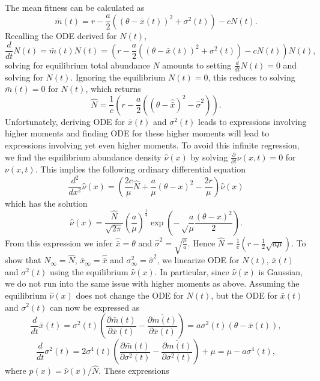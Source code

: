 \documentclass[]{article}
\begin{document}
The mean fitness can be calculated as \begin{equation}
\bar m(t)=r-\frac{a}{2}((\theta-\bar x(t))^2+\sigma^2(t))-cN(t).
\end{equation} Recalling the ODE derived for \(N(t)\), \begin{equation}
\frac{d}{dt}N(t)=\bar m(t)N(t)=(r-\frac{a}{2}((\theta-\bar x(t))^2+\sigma^2(t))-cN(t))N(t),
\end{equation} solving for equilibrium total abundance \(\hat N\)
amounts to setting \(\frac{d}{dt}N(t)=0\) and solving for \(N(t)\).
Ignoring the equilibrium \(N(t)=0\), this reduces to solving
\(\bar m(t)=0\) for \(N(t)\), which returns \begin{equation}
\hat N=\frac{1}{c}\left(r-\frac{a}{2}\left((\theta-\hat{\bar x})^2-\hat\sigma^2\right)\right).
\end{equation} Unfortunately, deriving ODE for \(\bar x(t)\) and
\(\sigma^2(t)\) leads to expressions involving higher moments and
finding ODE for these higher moments will lead to expressions involving
yet even higher moments. To avoid this infinite regression, we find the
equilibrium abundance density \(\hat\nu(x)\) by solving
\(\frac{\partial}{\partial t}\nu(x,t)=0\) for \(\nu(x,t)\). This implies
the following ordinary differential equation \begin{equation}
\frac{d^2}{dx^2}\hat\nu(x)=\left(\frac{2c}{\mu}\hat N+\frac{a}{\mu}(\theta-x)^2-\frac{2r}{\mu}\right)\hat\nu(x)
\end{equation} which has the solution \begin{equation}
\hat\nu(x)=\frac{\hat N}{\sqrt{2\pi}}\left(\frac{a}{\mu}\right)^{\frac{1}{4}}\exp\left(-\sqrt\frac{a}{\mu}\frac{(\theta-x)^2}{2}\right).
\end{equation} From this expression we infer \(\hat{\bar x}=\theta\) and
\(\hat\sigma^2=\sqrt{\frac{\mu}{a}}\). Hence
\(\hat N=\frac{1}{c}\left(r-\frac{1}{2}\sqrt{a\mu}\right)\). To show
that \(N_\infty=\hat N\), \(\bar x_\infty=\hat{\bar x}\) and
\(\sigma^2_\infty=\hat\sigma^2\), we linearize ODE for \(N(t)\),
\(\bar x(t)\) and \(\sigma^2(t)\) using the equilibrium \(\hat\nu(x)\).
In particular, since \(\hat\nu(x)\) is Gaussian, we do not run into the
same issue with higher moments as above. Assuming the equilibrium
\(\hat\nu(x)\) does not change the ODE for \(N(t)\), but the ODE for
\(\bar x(t)\) and \(\sigma^2(t)\) can now be expressed as
\begin{equation}
\frac{d}{dt}\bar x(t)=\sigma^2(t)\left(\frac{\partial\bar m(t)}{\partial\bar x(t)}-\overline{\frac{\partial m(t)}{\partial\bar x(t)}}\right)=a\sigma^2(t)(\theta-\bar x(t)),
\end{equation} \begin{equation}
\frac{d}{dt}\sigma^2(t)=2\sigma^4(t)\left(\frac{\partial\bar m(t)}{\partial\sigma^2(t)}-\overline{\frac{\partial m(t)}{\partial\sigma^2(t)}}\right)+\mu=\mu-a\sigma^4(t),
\end{equation} where \(\hat p(x)=\hat\nu(x)/\hat N\). These expressions
\end{document}
